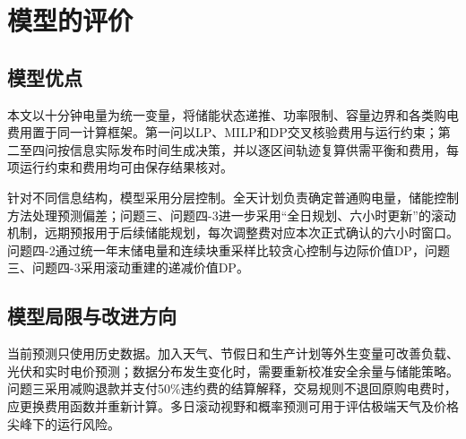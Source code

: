 \section{模型的评价}

\subsection{模型优点}

本文以十分钟电量为统一变量，将储能状态递推、功率限制、容量边界和各类购电费用置于同一计算框架。第一问以LP、MILP和DP交叉核验费用与运行约束；第二至四问按信息实际发布时间生成决策，并以逐区间轨迹复算供需平衡和费用，每项运行约束和费用均可由保存结果核对。

针对不同信息结构，模型采用分层控制。全天计划负责确定普通购电量，储能控制方法处理预测偏差；问题三、问题四-3进一步采用“全日规划、六小时更新”的滚动机制，远期预报用于后续储能规划，每次调整费对应本次正式确认的六小时窗口。问题四-2通过统一年末储电量和连续块重采样比较贪心控制与边际价值DP，问题三、问题四-3采用滚动重建的递减价值DP。

\subsection{模型局限与改进方向}

当前预测只使用历史数据。加入天气、节假日和生产计划等外生变量可改善负载、光伏和实时电价预测；数据分布发生变化时，需要重新校准安全余量与储能策略。问题三采用减购退款并支付50\%违约费的结算解释，交易规则不退回原购电费时，应更换费用函数并重新计算。多日滚动视野和概率预测可用于评估极端天气及价格尖峰下的运行风险。
